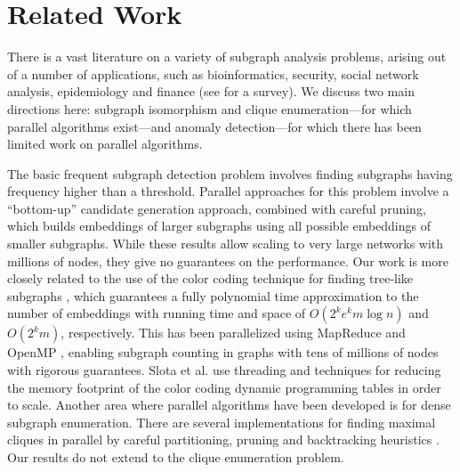 \section{Related Work}
\label{sec:related}
There is a vast literature on a variety of subgraph analysis problems, arising
out of a number of applications, such as bioinformatics, security,
social network analysis, epidemiology and finance (see  \cite{akoglu2014graph} for a survey).
We discuss two main directions here: 
subgraph isomorphism and clique
enumeration---for which parallel algorithms exist---and anomaly detection---for which
there has been limited work on parallel algorithms.

The basic frequent subgraph detection
problem involves finding subgraphs having  frequency higher than a threshold.
Parallel approaches for this problem involve a ``bottom-up'' candidate generation approach,
combined with careful pruning, which builds embeddings of larger subgraphs using all possible
embeddings of smaller subgraphs\cite{hamid2016scalemine, elsidy:vldb14}. While these results
allow scaling to very large networks with millions of nodes, they give no guarantees on
the performance. Our work is more closely related to the use of the color coding technique
for finding tree-like subgraphs \cite{alon2008biomolecular, huffner2008algorithm}, which
guarantees a fully polynomial time approximation to the number of embeddings with
running time and space of $O(2^ke^km\log{n})$ and $O(2^km)$, respectively.
This has been parallelized using MapReduce \cite{zhao2012sahad} and 
OpenMP \cite{slota:icpp13, slota:ipdps14}, enabling subgraph counting in graphs with
tens of millions of nodes with rigorous guarantees. Slota et al. \cite{slota:icpp13, slota:ipdps14}
use threading and techniques for reducing the memory footprint of the color coding
dynamic programming tables in order to scale. 
Another area where parallel algorithms have been developed is for dense subgraph enumeration.
There are several implementations for finding maximal cliques in parallel by
careful partitioning, pruning and backtracking heuristics
\cite{schmidt2009scalable, zhao2016parallel, aparicio:ispa14, cheng:kdd12, du:mcd09}.
Our results do not extend to the clique enumeration problem.

